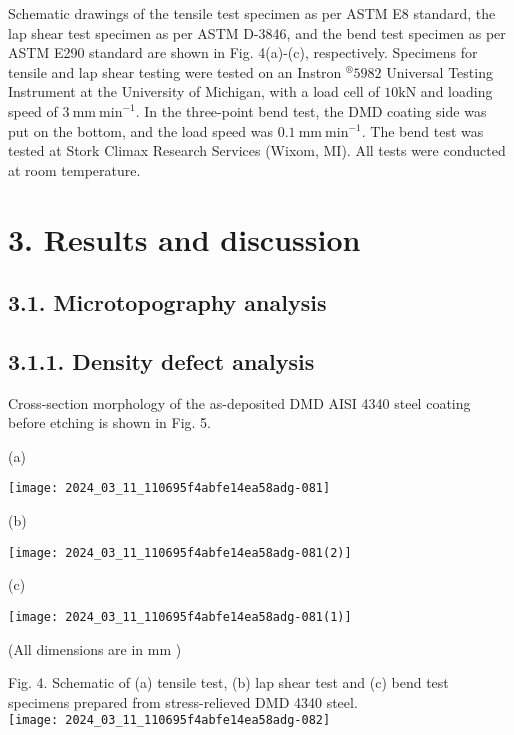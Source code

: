 \documentclass[10pt]{article}
\begin{document}
Schematic drawings of the tensile test specimen as per ASTM E8 standard, the lap shear test specimen as per ASTM D-3846, and the bend test specimen as per ASTM E290 standard are shown in Fig. 4(a)-(c), respectively. Specimens for tensile and lap shear testing were tested on an Instron ${ }^{\circledR} 5982$ Universal Testing Instrument at the University of Michigan, with a load cell of $10 \mathrm{kN}$ and loading speed of $3 \mathrm{~mm} \mathrm{~min}^{-1}$. In the three-point bend test, the DMD coating side was put on the bottom, and the load speed was $0.1 \mathrm{~mm} \mathrm{~min}^{-1}$. The bend test was tested at Stork Climax Research Services (Wixom, MI). All tests were conducted at room temperature.

\section*{3. Results and discussion}
\subsection*{3.1. Microtopography analysis}
\subsection*{3.1.1. Density defect analysis}
Cross-section morphology of the as-deposited DMD AISI 4340 steel coating before etching is shown in Fig. 5.

(a)

\begin{center}
\texttt{[image: 2024\_03\_11\_110695f4abfe14ea58adg-081]}
\end{center}

(b)

\begin{center}
\texttt{[image: 2024\_03\_11\_110695f4abfe14ea58adg-081(2)]}
\end{center}

(c)

\begin{center}
\texttt{[image: 2024\_03\_11\_110695f4abfe14ea58adg-081(1)]}
\end{center}

(All dimensions are in $\mathrm{mm}$ )

Fig. 4. Schematic of (a) tensile test, (b) lap shear test and (c) bend test specimens prepared from stress-relieved DMD 4340 steel.\\
\texttt{[image: 2024\_03\_11\_110695f4abfe14ea58adg-082]}
\end{document}
